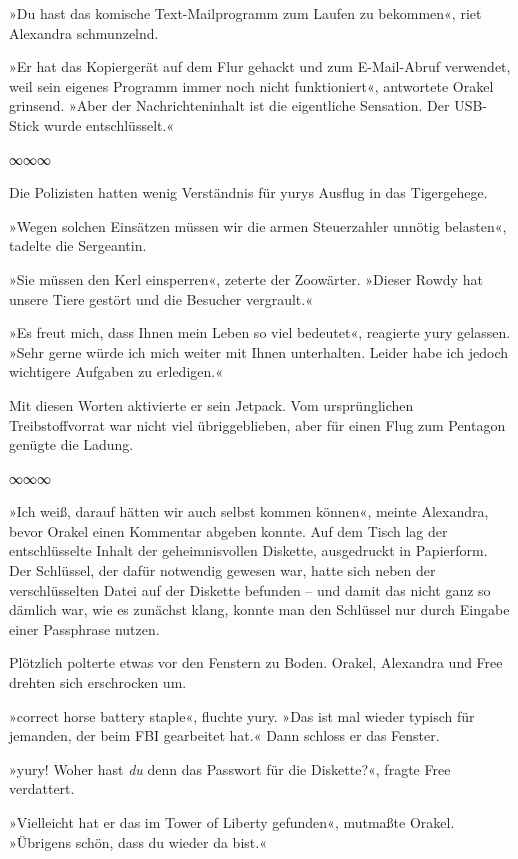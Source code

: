 »Du hast das komische Text-Mailprogramm zum Laufen zu bekommen«, riet Alexandra schmunzelnd.

»Er hat das Kopiergerät auf dem Flur gehackt und zum E-Mail-Abruf verwendet, weil sein eigenes Programm immer noch nicht funktioniert«, antwortete Orakel grinsend. »Aber der Nachrichteninhalt ist die eigentliche Sensation. Der USB-Stick wurde entschlüsselt.«

\begin{center}
	∞∞∞
\end{center}

Die Polizisten hatten wenig Verständnis für yurys Ausflug in das Tigergehege.

»Wegen solchen Einsätzen müssen wir die armen Steuerzahler unnötig belasten«, tadelte die Sergeantin.

»Sie müssen den Kerl einsperren«, zeterte der Zoowärter. »Dieser Rowdy hat unsere Tiere gestört und die Besucher vergrault.«

»Es freut mich, dass Ihnen mein Leben so viel bedeutet«, reagierte yury gelassen. »Sehr gerne würde ich mich weiter mit Ihnen unterhalten. Leider habe ich jedoch wichtigere Aufgaben zu erledigen.«

Mit diesen Worten aktivierte er sein Jetpack. Vom ursprünglichen Treibstoffvorrat war nicht viel übriggeblieben, aber für einen Flug zum Pentagon genügte die Ladung.

\begin{center}
	∞∞∞
\end{center}

»Ich weiß, darauf hätten wir auch selbst kommen können«, meinte Alexandra, bevor Orakel einen Kommentar abgeben konnte. Auf dem Tisch lag der entschlüsselte Inhalt der geheimnisvollen Diskette, ausgedruckt in Papierform. Der Schlüssel, der dafür notwendig gewesen war, hatte sich neben der verschlüsselten Datei auf der Diskette befunden – und damit das nicht ganz so dämlich war, wie es zunächst klang, konnte man den Schlüssel nur durch Eingabe einer Passphrase nutzen.

Plötzlich polterte etwas vor den Fenstern zu Boden. Orakel, Alexandra und Free drehten sich erschrocken um.

»correct horse battery staple«, fluchte yury. »Das ist mal wieder typisch für jemanden, der beim FBI gearbeitet hat.« Dann schloss er das Fenster.

»yury! Woher hast \emph{du} denn das Passwort für die Diskette?«, fragte Free verdattert.

»Vielleicht hat er das im Tower of Liberty gefunden«, mutmaßte Orakel. »Übrigens schön, dass du wieder da bist.«

